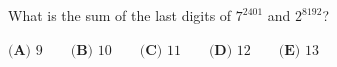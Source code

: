 What is the sum of the last digits of $7^{2401}$ and $2^{8192}$?

$\textbf{(A) } 9 \qquad \textbf{(B) } 10 \qquad \textbf{(C) } 11 \qquad \textbf{(D) } 12 \qquad \textbf{(E) } 13$

